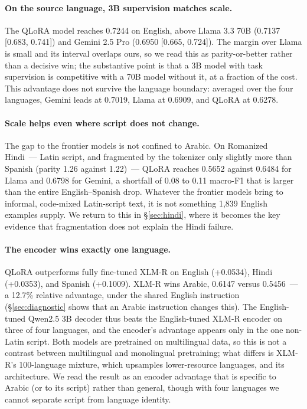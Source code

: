 \documentclass[11pt]{article}
\begin{document}
\paragraph{On the source language, 3B supervision matches scale.}
The QLoRA model reaches 0.7244 on English, above Llama 3.3 70B (0.7137
[0.683, 0.741]) and Gemini 2.5 Pro (0.6950 [0.665, 0.724]). The margin over Llama
is small and its interval overlaps ours, so we read this as parity-or-better
rather than a decisive win; the substantive point is that a 3B model with task
supervision is competitive with a 70B model without it, at a fraction of the cost.
This advantage does not survive the language boundary: averaged over the four
languages, Gemini leads at 0.7019, Llama at 0.6909, and QLoRA at 0.6278.

\paragraph{Scale helps even where script does not change.}
The gap to the frontier models is not confined to Arabic. On Romanized Hindi~---
Latin script, and fragmented by the tokenizer only slightly more than Spanish
(parity 1.26 against 1.22)~--- QLoRA reaches 0.5652 against 0.6484 for Llama and 0.6798 for
Gemini, a shortfall of 0.08 to 0.11 macro-F1 that is larger than the entire
English--Spanish drop. Whatever the frontier models bring to informal, code-mixed
Latin-script text, it is not something 1{,}839 English examples supply. We return
to this in \S\ref{sec:hindi}, where it becomes the key evidence that fragmentation
does not explain the Hindi failure.


\paragraph{The encoder wins exactly one language.}
QLoRA outperforms fully fine-tuned \mbox{XLM-R} on English (+0.0534), Hindi (+0.0353),
and Spanish (+0.1009). \mbox{XLM-R} wins Arabic, 0.6147 versus 0.5456~--- a 12.7\%
relative advantage, under the shared English instruction
(\S\ref{sec:diagnostic} shows that an Arabic instruction changes this). The English-tuned Qwen2.5 3B decoder thus beats the
English-tuned \mbox{XLM-R} encoder on three of four languages, and the encoder's
advantage appears only in the one non-Latin script. Both models are pretrained on
multilingual data, so this is not a contrast between multilingual and monolingual
pretraining; what differs is \mbox{XLM-R}'s 100-language mixture, which upsamples
lower-resource languages, and its architecture. We read the result as an encoder advantage that is specific to
Arabic (or to its script) rather than general, though with four languages we cannot
separate script from language identity.
\end{document}
